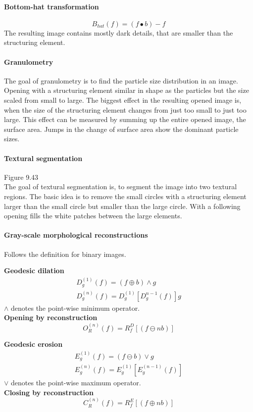 \paragraph{Bottom-hat transformation}
\[
	B_{hat}(f) = (f \bullet b)-f
\]
The resulting image contains mostly dark details, that are smaller than the structuring element.
\paragraph{Granulometry}
The goal of granulometry is to find the particle size distribution in an image. Opening with a structuring element similar in shape as the particles but the size scaled from small to large. The biggest effect in the resulting opened image is, when the size of the structuring element changes from just too small to just too large. This effect can be measured by summing up the entire opened image, the surface area. Jumps in the change of surface area show the dominant particle sizes.
\paragraph{Textural segmentation}
Figure 9.43\\
The goal of textural segmentation is, to segment the image into two textural regions. The basic idea is to remove the small circles with a structuring element larger than the small circle but smaller than the large circle. With a following opening fills the white patches between the large elements.
\paragraph{Gray-scale morphological reconstructions}
Follows the definition for binary images.\\

\begin{multicols}{2}
\textbf{Geodesic dilation}
\begin{align*}
	D_g^{(1)}(f) = (f\oplus b)\wedge g\\
	D_g^{(n)}(f) = D_g^{(1)}[D_g^{n-1}(f)] g
\end{align*}
$\wedge$ denotes the point-wise minimum operator. \\

\textbf{Opening by reconstruction}
	\[
		O_R^{(n)} (f) = R_f^D \left[ (f \ominus nb) \right]
	\]

\textbf{Geodesic erosion}
\begin{align*}
	E_g^{(1)}(f) = (f\ominus b)\vee g\\
	E_g^{(n)}(f) = E_g^{(1)}[E_g^{(n-1)}(f)]
\end{align*}
$\vee$ denotes the point-wise maximum operator. \\

\textbf{Closing by reconstruction}
	\[
		C_R^{(n)} (f) = R_f^E \left[ (f \oplus nb) \right]
	\]
\end{multicols}
